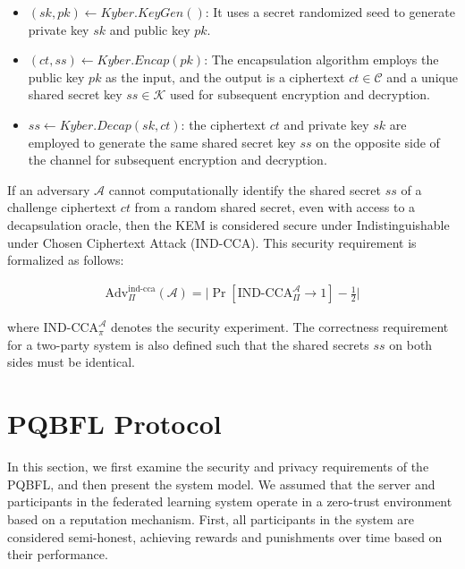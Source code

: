 \documentclass[a4paper,fleqn]{cas-dc}
\begin{document}
\begin{itemize}
    \item $\left ( sk ,pk\right )\leftarrow Kyber.KeyGen\left (  \right )$: It uses a secret randomized seed to generate private key $sk$ and public key $pk$.
    \item $ (ct,ss)\leftarrow Kyber.Encap\left ( pk \right )$: The encapsulation algorithm employs the public key $pk$ as the input, and the output is a ciphertext $ct \in \mathcal{C}$ and a unique shared secret key $ss \in \mathcal{K}$  used for subsequent encryption and decryption.
    \item $ss \leftarrow Kyber.Decap (sk,ct)$: the ciphertext $ct$ and private key $sk$ are employed to generate the same shared secret key $ss$ on the opposite side of the channel for subsequent encryption and decryption.
\end{itemize}
If an adversary $\mathcal{A}$ cannot computationally identify the shared secret $ss$ of a challenge ciphertext $ct$ from a random shared secret, even with access to a decapsulation oracle, then the KEM is considered secure under Indistinguishable under Chosen Ciphertext Attack (IND-CCA). 
This security requirement is formalized as follows:


\begin{equation}
    \begin{aligned}
        \text{Adv}_{\Pi}^{\text{ind-cca}}(\mathcal{A}) = \Big| \Pr \left[ \text{IND-CCA}_{\Pi}^{\mathcal{A}} \rightarrow 1 \right] - \frac{1}{2} \Big| 
    \end{aligned}
\end{equation}

\noindent where $\text{IND-CCA}_{\pi}^{\mathcal{A}}$ denotes the security experiment. 
The correctness requirement for a two-party system is also defined such that the shared secrets $ss$ on both sides must be identical.


\section{PQBFL Protocol}
\label{PQBFL Protocol}
In this section, we first examine the security and privacy requirements of the PQBFL, and then present the system model. 
We assumed that the server and participants in the federated learning system operate in a zero-trust environment based on a reputation mechanism. 
First, all participants in the system are considered semi-honest, achieving rewards and punishments over time based on their performance.
\end{document}
